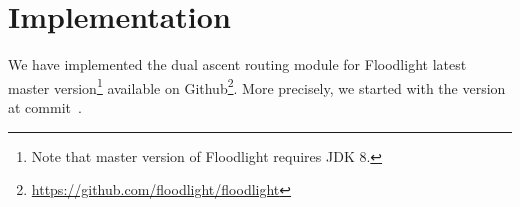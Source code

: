 \chapter{Implementation}\label{ch:implementation}

We have implemented the dual ascent routing module for Floodlight latest master
version\footnote{Note that master version of Floodlight requires JDK 8.}
available on Github\footnote{\url{https://github.com/floodlight/floodlight}}.
More precisely, we started with the version at
commit~\href{https://github.com/floodlight/floodlight/tree/d737cb05656a6038f4e2277ffb4503d45b7b29cb}{}.



